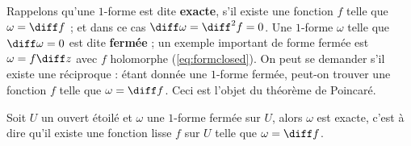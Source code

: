 Rappelons qu'une $1$-forme est dite \textbf{exacte}, s'il existe une fonction $f$ telle que $\omega=\diff f$ ; et dans ce cas $\diff \omega=\diff^2 f= 0$. Une $1$-forme $\omega$ telle que $\diff \omega =0$ est dite \textbf{fermée} ; un exemple important de forme fermée est $\omega = f \diff z$ avec $f$ holomorphe (\ref{eq:formclosed}). On peut se demander s'il existe une réciproque : étant donnée une $1$-forme fermée, peut-on trouver une fonction $f$ telle que $\omega=\diff f$. Ceci est l'objet du théorème de Poincaré.

\begin{fthm}
Soit $U$ un ouvert étoilé et $\omega$ une $1$-forme fermée sur $U$, alors $\omega$ est exacte, c'est à dire qu'il existe une fonction lisse $f$ sur $U$ telle que $\omega = \diff f$.
\end{fthm}

